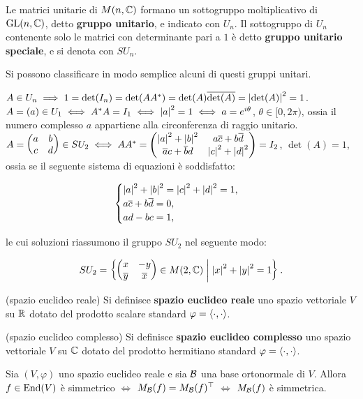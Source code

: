 \begin{definition}
	Le matrici unitarie di $M(n, \mathbb C)$ formano un sottogruppo moltiplicativo di $\operatorname{GL}(n, \mathbb C)$, detto \textbf{gruppo unitario},
	e indicato con $U_n$. Il sottogruppo di $U_n$ contenente solo le matrici con determinante pari a $1$ è
	detto \textbf{gruppo unitario speciale}, e si denota con $SU_n$.
\end{definition}

\begin{remark}\nl
	Si possono classificare in modo semplice alcuni di questi gruppi unitari.
	
	\li $A \in U_n \implies 1 = \det(I_n) = \det(A A^*) = \det(A) \overline{\det(A)} = \left\lvert \det(A) \right\rvert^2 = 1$.
	\li $A = (a) \in U_1 \iff A^* A = I_1 \iff \left\lvert a \right\rvert^2 = 1 \iff a = e^{i\theta}$, $\theta \in [0, 2\pi)$, ossia il numero complesso $a$ appartiene alla circonferenza di raggio unitario.
	\li $A = \begin{pmatrix} a & b \\ c & d \end{pmatrix} \in SU_2 \iff A A^* = \begin{pmatrix} \left\lvert a \right\rvert^2 + \left\lvert b \right\rvert^2 & a\overline{c} + b \overline{d} \\ \overline{a} c + \overline{b} d & \left\lvert c \right\rvert^2 + \left\lvert d \right\rvert^2 \end{pmatrix} = I_2$, $\det(A) = 1$, ossia se il seguente
	sistema di equazioni è soddisfatto:
	
	\[ \begin{cases} \left\lvert a \right\rvert^2 + \left\lvert b \right\rvert^2 = \left\lvert c \right\rvert^2 + \left\lvert d \right\rvert^2 = 1, \\ a\overline{c} + b \overline{d} = 0, \\ ad-bc=1, \end{cases} \]
	
	le cui soluzioni riassumono il gruppo $SU_2$ nel seguente modo:
	
	\[ SU_2 = \left\{ \begin{pmatrix} x & -y \\ \overline{y} & \overline{x} \end{pmatrix} \in M(2, \mathbb C) \;\middle\vert\; \left\lvert x \right\rvert^2 + \left\lvert y \right\rvert^2 = 1 \right\}. \]
	
\end{remark}

\begin{definition} (spazio euclideo reale)
	Si definisce \textbf{spazio euclideo reale} uno spazio vettoriale $V$ su $\mathbb R$ dotato
	del prodotto scalare standard $\varphi = \langle \cdot, \cdot \rangle$.
\end{definition}

\begin{definition} (spazio euclideo complesso)
	Si definisce \textbf{spazio euclideo complesso} uno spazio vettoriale $V$ su $\mathbb C$ dotato
	del prodotto hermitiano standard $\varphi = \langle \cdot, \cdot \rangle$.
\end{definition}

\begin{proposition}
	Sia $(V, \varphi)$ uno spazio euclideo reale e sia $\mathcal{B}$ una base ortonormale di $V$. Allora $f \in \operatorname{End}(V)$ è simmetrico $\iff$ $M_{\mathcal{B}}(f) = M_{\mathcal{B}}(f)^\top$ $\iff$ $M_{\mathcal{B}}(f)$ è simmetrica.
\end{proposition}

